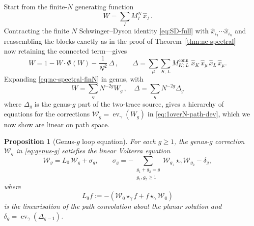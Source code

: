 \documentclass[11pt,a4paper]{article}
\newtheorem{proposition}[theorem]{Proposition}
\DeclareMathOperator{\ev}{ev}
\newcommand{\xh}{\hat{x}}
\newcommand{\cW}{\mathcal{W}}
\begin{document}
Start from the finite-$N$ generating function
%
\begin{equation}
W=\sum_I M^N_I\,\xh_I\,.
\end{equation}
%
Contracting the finite $N$ Schwinger--Dyson identity \eqref{eq:SD-full} with $\xh_{i_1}\cdots\xh_{i_n}$ and reassembling the blocks exactly as in the proof of Theorem~\ref{thm:nc-spectral}---now retaining the connected term---gives 
\begin{equation}\label{eq:nc-spectral-finN}
  W = 1 - W\cdot\Phi(W) - \frac{1}{N^{2}}\,\Delta\,, \qquad \Delta = \sum_{\mu}\sum_{K,L} M^{\mathrm{conn}}_{K;\,L}\;
  \xh_K\,\xh_\mu\,\xh_L\,\xh_\mu.
\end{equation}
%
Expanding \eqref{eq:nc-spectral-finN} in genus, with
%
\begin{equation}\label{eq:genus-exp-W-Delta}
W=\sum_g N^{-2g}W_g\,, \quad \Delta=\sum_g N^{-2g}\Delta_g
\end{equation}
%
where $\Delta_g$ is the genus-$g$ part of the two-trace source, gives a hierarchy of equations for the corrections $\cW_g=\ev_\gamma(W_g)$ in \eqref{eq:1overN-path-dev}, which we now show are linear on path space.

\begin{proposition}[Genus-$g$ loop equation]\label{thm:genus-g-loop}
For each $g\geq1$, the genus-$g$ correction $\cW_g$ in \eqref{eq:genus-g} satisfies the \emph{linear} Volterra equation
\begin{equation}\label{eq:genus-g-loop}
  \cW_g = L_0\,\cW_g + \sigma_g,
  \qquad
  \sigma_g = -\sum_{\substack{g_1+g_2=g\\g_1,g_2\geq1}}\cW_{g_1}\star_\gamma\cW_{g_2} - \delta_g,
\end{equation}
where 
\begin{equation}\label{eq:lin-convolution}
L_0 f := -(\cW_0\star_\gamma f + f\star_\gamma\cW_0)
\end{equation}
%
is the linearisation of the path convolution about the planar solution and $\delta_g=\ev_\gamma(\Delta_{g-1})$.
\end{proposition}
\end{document}
